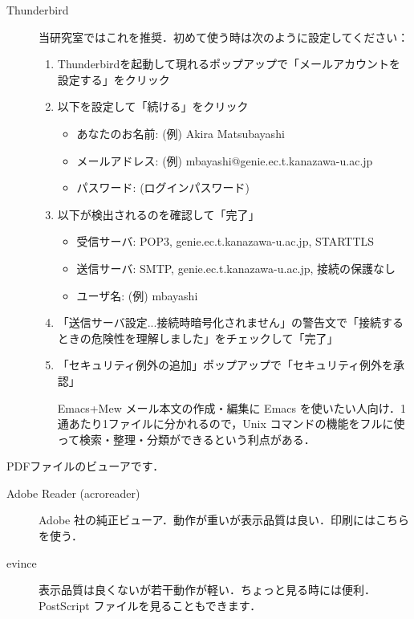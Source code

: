 \documentclass[main]{subfiles}
\begin{document}
\begin{description}[itemsep=1em]
    \begin{description}
        \item[Thunderbird] 当研究室ではこれを推奨．初めて使う時は次のように設定してください：
        \begin{enumerate}
            \item Thunderbirdを起動して現れるポップアップで「メールアカウントを設定する」をクリック
            \item 以下を設定して「続ける」をクリック
                \begin{itemize}
                    \item あなたのお名前: (例) Akira Matsubayashi
                    \item メールアドレス: (例) mbayashi@genie.ec.t.kanazawa-u.ac.jp
                    \item パスワード: (ログインパスワード)
                \end{itemize}
            \item 以下が検出されるのを確認して「完了」
                \begin{itemize}
                    \item 受信サーバ: POP3, genie.ec.t.kanazawa-u.ac.jp, STARTTLS
                    \item 送信サーバ: SMTP, genie.ec.t.kanazawa-u.ac.jp, 接続の保護なし
                    \item ユーザ名: (例) mbayashi
                \end{itemize}
            \item 「送信サーバ設定...接続時暗号化されません」の警告文で「接続するときの危険性を理解しました」をチェックして「完了」
            \item 「セキュリティ例外の追加」ポップアップで「セキュリティ例外を承認」
        \item [Emacs+Mew] メール本文の作成・編集に Emacs を使いたい人向け．1 通あたり1ファイルに分かれるので，Unix コマンドの機能をフルに使って検索・整理・分類ができるという利点がある．
        \end{enumerate}
    \end{description}
    \item[PDF ビューア] PDFファイルのビューアです．    
    \begin{description}
        \item[Adobe Reader (acroreader)] Adobe 社の純正ビューア．動作が重いが表示品質は良い．印刷にはこちらを使う．
        \item[evince] 表示品質は良くないが若干動作が軽い．ちょっと見る時には便利．PostScript ファイルを見ることもできます．

\end{description}
\end{description}
\end{document}
